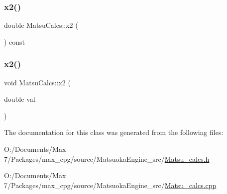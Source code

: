 \mbox{\label{classMatsuCalcs_a527c4bf853224575c68e6f80082d42f6}} 
\subsubsection{\texorpdfstring{x2()}{x2()}\hspace{0.1cm}{\footnotesize\ttfamily [1/2]}}
{\footnotesize\ttfamily double Matsu\+Calcs\+::x2 (\begin{DoxyParamCaption}{ }\end{DoxyParamCaption}) const\hspace{0.3cm}{\ttfamily [inline]}}

\mbox{\label{classMatsuCalcs_a7a8ad3e345dcb149244c7d1d84e9912c}} 
\subsubsection{\texorpdfstring{x2()}{x2()}\hspace{0.1cm}{\footnotesize\ttfamily [2/2]}}
{\footnotesize\ttfamily void Matsu\+Calcs\+::x2 (\begin{DoxyParamCaption}\item[{double}]{val }\end{DoxyParamCaption})\hspace{0.3cm}{\ttfamily [inline]}}



The documentation for this class was generated from the following files\+:\begin{DoxyCompactItemize}
\item 
O\+:/\+Documents/\+Max 7/\+Packages/max\+\_\+cpg/source/\+Matsuoka\+Engine\+\_\+src/\mbox{\hyperlink{Matsu__calcs_8h}{Matsu\+\_\+calcs.\+h}}\item 
O\+:/\+Documents/\+Max 7/\+Packages/max\+\_\+cpg/source/\+Matsuoka\+Engine\+\_\+src/\mbox{\hyperlink{Matsu__calcs_8cpp}{Matsu\+\_\+calcs.\+cpp}}\end{DoxyCompactItemize}
